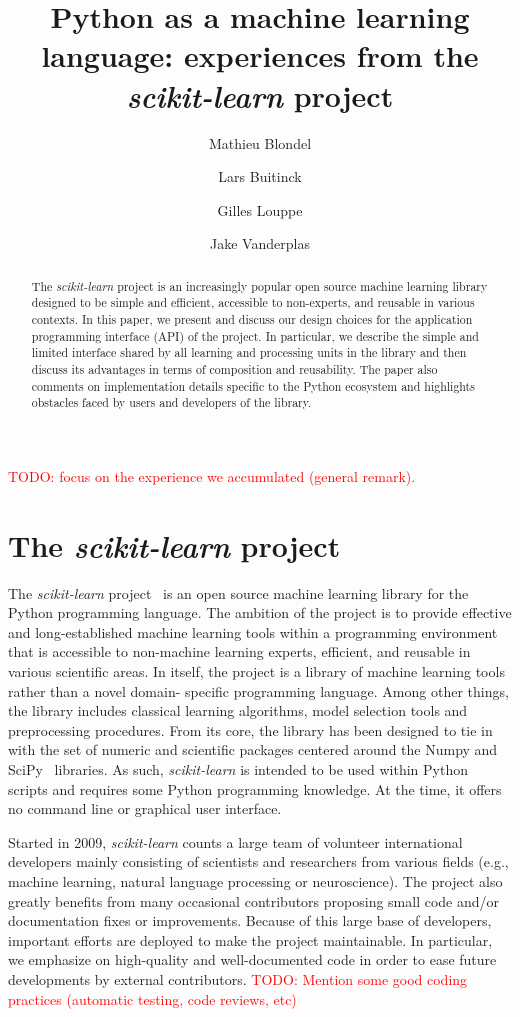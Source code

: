 \documentclass{llncs}
\title{Python as a machine learning language:
       experiences from the \textit{scikit-learn} project}
\author{Mathieu Blondel\inst{1} \and
        Lars Buitinck\inst{2} \and
        Gilles Louppe\inst{3} \and
        Jake Vanderplas\inst{4}}
\institute{Graduate School of System Informatics, Kobe University \and
           Informatics Institute, University of Amsterdam \and
           Department of EE \& CS, University of Liège \and
           Astronomy Department, University of Washington}
\begin{document}
\maketitle

\begin{abstract}
The \textit{scikit-learn} project is an increasingly popular open source machine
learning library designed to be simple and efficient, accessible to non-experts,
and reusable in various contexts. In this paper, we present and discuss our
design choices for the application programming interface (API) of the project.
In particular, we describe the simple and limited interface shared by all
learning and processing units in the library and then discuss its advantages in
terms of composition and reusability. The paper also comments on implementation
details specific to the Python ecosystem and highlights obstacles faced by users
and developers of the library.
\end{abstract}

\textcolor{red}{TODO: focus on the experience we accumulated (general remark).}

\section{The \textit{scikit-learn} project}

The \textit{scikit-learn} project~\citep{pedregosa2011} is an open source
machine learning library for the Python programming language. The ambition of
the project is to provide  effective and long-established machine learning tools
within a programming environment that is accessible to non-machine learning
experts, efficient, and reusable in various scientific areas. In itself, the
project is a library of machine learning tools  rather than  a novel domain-
specific programming language. Among other things, the library includes
classical learning algorithms, model selection tools and preprocessing
procedures. From its core, the library has been designed to tie in with the set
of numeric and scientific packages centered around the Numpy and
SciPy~\citep{vanderwalt2011, varoquaux2013scipy} libraries. As such, \textit
{scikit-learn} is intended to be used within Python scripts and requires some
Python programming knowledge. At the time, it offers no command line or
graphical user interface.

Started in 2009, \textit{scikit-learn} counts a large team of volunteer
international developers mainly consisting of scientists and researchers from
various fields (e.g., machine learning, natural language processing or
neuroscience). The project also greatly benefits from many occasional
contributors proposing small code and/or documentation fixes or improvements.
Because of this large base of developers, important efforts are deployed to make
the project maintainable. In particular, we emphasize on high-quality and well-documented
code  in order to ease future developments by external contributors.
\textcolor{red}{TODO: Mention some good coding practices (automatic testing, code
reviews, etc)}
\end{document}
